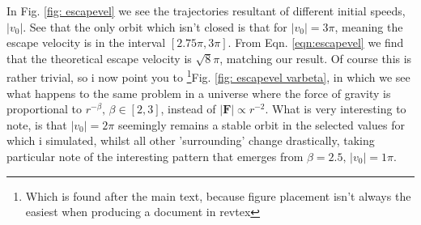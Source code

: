 \documentclass[10pt,showpacs,preprintnumbers,amsmath,amssymb,nofootinbib,aps,prl,twocolumn,groupedaddress,superscriptaddress,showkeys]{revtex4-1}
\begin{document}
    In Fig. \ref{fig: escapevel} we see the trajectories resultant of different initial speeds, $|v_0|$. See that the only orbit which isn't closed is that for $|v_0|=3\pi$, meaning the escape velocity is in the interval $[2.75\pi, 3\pi]$. From Eqn. \ref{eqn:escapevel} we find that the theoretical escape velocity is $\sqrt{8}\pi$, matching our result. Of course this is rather trivial, so i now point you to \footnote{Which is found after the main text, because figure placement isn't always the easiest when producing a document in revtex}Fig. \ref{fig: escapevel varbeta}, in which we see what happens to the same problem in a universe where the force of gravity is proportional to $r^{-\beta}, \, \beta \in [2, 3]$, instead of $|\mathbf F| \propto r^{-2}$. What is very interesting to note, is that $|v_0|=2\pi$ seemingly remains a stable orbit in the selected values for which i simulated, whilst all other 'surrounding' change drastically, taking particular note of the interesting pattern that emerges from $\beta=2.5, \, |v_0| = 1\pi$. 
\end{document}
